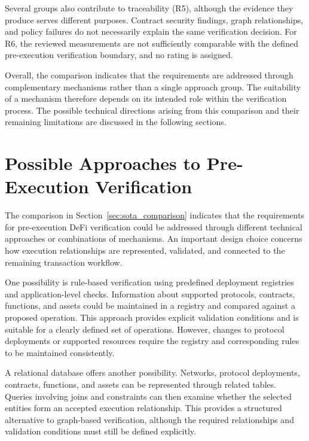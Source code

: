 Several groups also contribute to traceability (R5),
although the evidence they produce serves different
purposes. Contract security findings, graph relationships,
and policy failures do not necessarily explain the same
verification decision. For R6, the reviewed measurements
are not sufficiently comparable with the defined
pre-execution verification boundary, and no rating
is assigned.

Overall, the comparison indicates that the requirements
are addressed through complementary mechanisms rather
than a single approach group. The suitability of a
mechanism therefore depends on its intended role within
the verification process. The possible technical directions arising from this
comparison and their remaining limitations are discussed
in the following sections.



\section{Possible Approaches to Pre-Execution Verification}
\label{sec:sota_alternative_approaches}

The comparison in Section~\ref{sec:sota_comparison} indicates
that the requirements for pre-execution DeFi verification
could be addressed through different technical approaches
or combinations of mechanisms. An important design choice
concerns how execution relationships are represented,
validated, and connected to the remaining transaction
workflow.

One possibility is rule-based verification using predefined
deployment registries and application-level checks.
Information about supported protocols, contracts, functions,
and assets could be maintained in a registry and compared
against a proposed operation. This approach provides explicit
validation conditions and is suitable for a clearly defined
set of operations. However, changes to protocol deployments
or supported resources require the registry and corresponding
rules to be maintained consistently. 

A relational database offers another possibility. Networks,
protocol deployments, contracts, functions, and assets can
be represented through related tables. Queries involving
joins and constraints can then examine whether the selected
entities form an accepted execution relationship. This
provides a structured alternative to graph-based verification,
although the required relationships and validation conditions
must still be defined explicitly.

